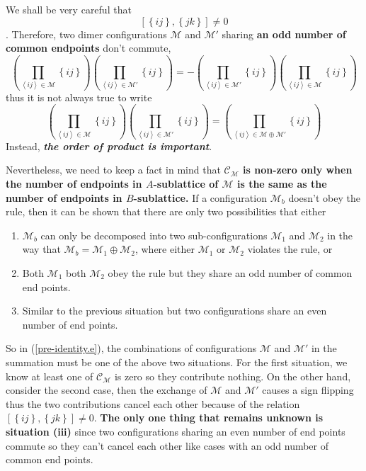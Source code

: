 \documentclass[12font]{article}
\theoremstyle{definition}
\numberwithin{equation}{section}
\newcommand{\anglelr}[1]{\left\langle #1 \right\rangle}
\newcommand{\lr}[1]{\left(  #1  \right)}
\newcommand{\lrg}[1]{\left\{  #1  \right\}}
\newcommand{\alert}[1]{{\color{red}#1}}
\begin{document}
\alert{We shall be very careful that 
\[[\lrg{ij},\lrg{jk}]\neq 0\]
. Therefore, two dimer configurations $\mathcal{M}$ and $\mathcal{M}'$ sharing \textbf{an odd number of common endpoints} don't commute,
\[
\lr{\prod_{\anglelr{ij}\in\mathcal{M}}\lrg{ij}} \lr{\prod_{\anglelr{ij}\in\mathcal{M}'}\lrg{ij}} = -\lr{\prod_{\anglelr{ij}\in\mathcal{M}'}\lrg{ij}} \lr{\prod_{\anglelr{ij}\in\mathcal{M}}\lrg{ij}}
\]
thus it is not always true to write 
\[
\lr{\prod_{\anglelr{ij}\in\mathcal{M}}\lrg{ij}} \lr{\prod_{\anglelr{ij}\in\mathcal{M}'}\lrg{ij}} = \lr{\prod_{\anglelr{ij}\in\mathcal{M}\oplus\mathcal{M}'}\lrg{ij}}
\]
Instead, \textbf{\emph{the order of product is important}}. 

Nevertheless, we need to keep a fact in mind that \textbf{$\mathcal{C}_\mathcal{M}$ is non-zero only when the number of endpoints in $A$-sublattice of $\mathcal{M}$ is the same as the number of endpoints in $B$-sublattice.} If a configuration $\mathcal{M}_b$  doesn't obey the rule, then it can be shown that there are only two possibilities that either 
\begin{enumerate}
  \item [(i)]$\mathcal{M}_b$ can only be decomposed into two sub-configurations $\mathcal{M}_1$ and $\mathcal{M}_2$ in the way that $\mathcal{M}_b = \mathcal{M}_1\oplus\mathcal{M}_2$, where either $\mathcal{M}_1$ or $\mathcal{M}_2$ violates the rule, or
  \item [(ii)] Both $\mathcal{M}_1$ both $\mathcal{M}_2$ obey the rule but they share an odd number of common end points. 
  \item [(iii)] Similar to the previous situation but two configurations share an even number of end points.
\end{enumerate}
So in (\ref{pre-identity.e}), the combinations of configurations $\mathcal{M}$ and $\mathcal{M}'$ in the summation must be one of the above two situations. For the first situation, we know at least one of $\mathcal{C}_{\mathcal{M}}$ is zero so they contribute nothing. On the other hand, consider the second case, then the exchange of $\mathcal{M}$ and $\mathcal{M}'$ causes a sign flipping thus the two contributions cancel each other because of the relation $[\lrg{ij},\lrg{jk}]\neq 0$. \textbf{The only one thing that remains unknown is situation (iii)} since two configurations sharing an even number of end points commute so they can't cancel each other like cases with an odd number of common end points. 
}
\end{document}
